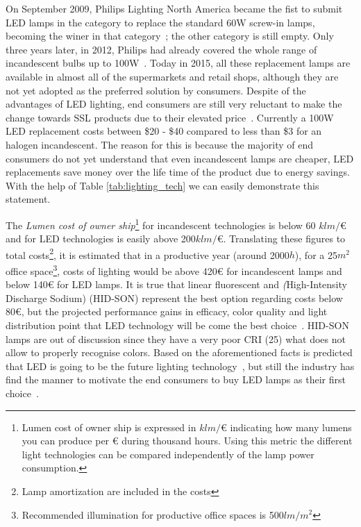On September 2009, Philips Lighting North America became the fist to submit LED lamps in the category to replace the standard 60W screw-in lamps, becoming the winer in that category~\cite{web:Winer-LPrize,web:Wright}; the other category is still empty. Only three years later, in 2012, Philips had already covered the whole range of incandescent bulbs up to 100W~\cite{13liedenbaum}. Today in 2015, all these replacement lamps are available in almost all of the supermarkets and retail shops, although they are not yet adopted as the preferred solution by consumers. Despite of the advantages of LED lighting, end consumers are still very reluctant to make the change towards SSL products due to their elevated price~\cite{11Voger,15Greig}. Currently a 100W LED replacement costs between \$20 - \$40 compared to less than \$3 for an halogen incandescent. The reason for this is because the majority of end consumers do not yet understand that even incandescent lamps are cheaper, LED replacements save money over the life time of the product due to energy savings. With the help of Table \ref{tab:lighting_tech} we can easily demonstrate this  statement.

The \emph{Lumen cost of owner ship}\footnote{Lumen cost of owner ship is expressed in $klm/$€ indicating how many lumens you can produce per € during thousand hours. Using this metric the different light technologies can be compared independently of the lamp power consumption.} for incandescent technologies is below 60 $klm/$€ and for LED technologies is easily above 200$klm/$€. Translating these figures to total costs\footnote{Lamp amortization are included in the costs}, it is estimated that in a productive year (around 2000$h$), for a 25$ m^2 $  office space\footnote{Recommended illumination for productive office spaces is 500$ lm/m^2 $}, costs of lighting would be above 420€ for incandescent lamps and below 140€ for LED lamps. It is true that linear fluorescent and \emph(High-Intensity Discharge Sodium) (HID-SON) represent the best option regarding costs below 80€, but the projected performance gains in efficacy, color quality and light distribution point that LED technology will be come the best choice~\cite{14Braga}. HID-SON lamps are out of discussion since they  have a very poor CRI (25) what does not allow to properly recognise colors. Based on the aforementioned facts is predicted that LED is going to be the future lighting technology~\cite{13Uken,14USDoE}, but still the industry has find the manner to motivate the end consumers to buy LED lamps as their first choice~\cite{11Voger}.


